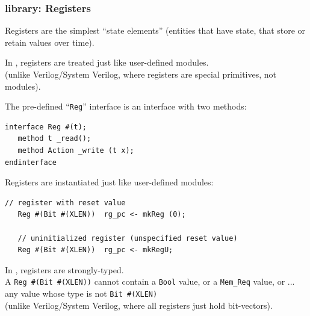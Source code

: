 \begin{frame}[fragile]
\frametitle{{\BSV} library: Registers}

\footnotesize

Registers are the simplest ``state elements'' (entities that have
state, {\ie} that store or retain values over time).

\vspace{2ex}

In {\BSV}, registers are treated just like user-defined modules. \\
(unlike Verilog/System Verilog, where registers are special primitives, not modules).

\vspace{2ex}

The pre-defined ``{\tt Reg}'' interface is an interface with two methods:

\begin{Verbatim}[frame=single]
interface Reg #(t);
   method t _read();
   method Action _write (t x);
endinterface
\end{Verbatim}

\vspace{1ex}

Registers are instantiated just like user-defined modules:

\begin{Verbatim}[frame=single]
    // register with reset value
   Reg #(Bit #(XLEN))  rg_pc <- mkReg (0);

   // uninitialized register (unspecified reset value)
   Reg #(Bit #(XLEN))  rg_pc <- mkRegU;
\end{Verbatim}

\vspace{2ex}

In {\BSV}, registers are strongly-typed. \\
A \verb|Reg #(Bit #(XLEN))| cannot contain a {\tt Bool} value,
  or a \verb|Mem_Req| value,
  or ... any value whose type is not \verb|Bit #(XLEN)| \\
(unlike Verilog/System Verilog, where all registers just hold bit-vectors).

\end{frame}


